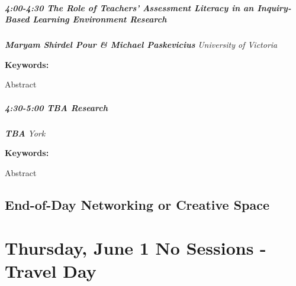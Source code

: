 \documentclass[
]{book}
\begin{document}
\begin{session}
\hypertarget{the-role-of-teachers-assessment-literacy-in-an-inquiry-based-learning-environment-research}{%
\paragraph*{\texorpdfstring{4:00-4:30 \textbar{} \textbf{The Role of
Teachers' Assessment Literacy in an Inquiry-Based Learning Environment}
\textbar{}
Research}{4:00-4:30 \textbar{} The Role of Teachers' Assessment Literacy in an Inquiry-Based Learning Environment \textbar{} Research}}\label{the-role-of-teachers-assessment-literacy-in-an-inquiry-based-learning-environment-research}}

\textbf{\emph{Maryam Shirdel Pour \& Michael Paskevicius}} \textbar{}
\emph{University of Victoria}

\textbf{Keywords:}

Abstract
\end{session}

\begin{session}
\hypertarget{tba-research}{%
\paragraph*{\texorpdfstring{4:30-5:00 \textbar{} \textbf{TBA} \textbar{}
Research}{4:30-5:00 \textbar{} TBA \textbar{} Research}}\label{tba-research}}

\textbf{\emph{TBA}} \textbar{} \emph{York}

\textbf{Keywords:}

Abstract
\end{session}

\hypertarget{end-of-day-networking-or-creative-space}{%
\section*{End-of-Day Networking or Creative Space}\label{end-of-day-networking-or-creative-space}}

\hypertarget{thursday-june-1-no-sessions---travel-day}{%
\chapter{Thursday, June 1 \textbar{} No Sessions - Travel Day}\label{thursday-june-1-no-sessions---travel-day}}
\end{document}
